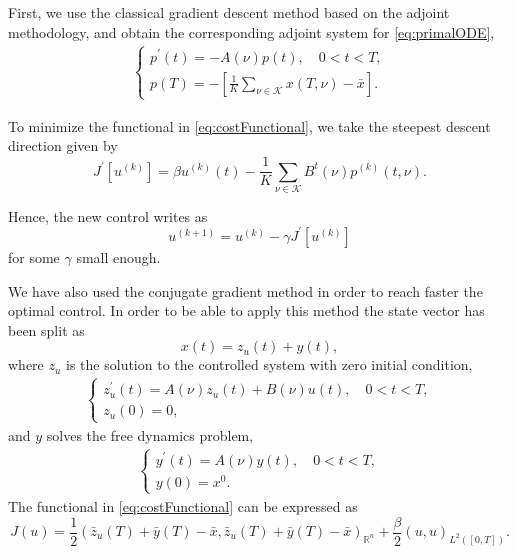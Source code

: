 \documentclass[10pt,a4paper]{article}
\begin{document}
First, we use the classical gradient descent method based on the adjoint methodology, and obtain the corresponding adjoint system for \eqref{eq:primalODE},
%
\begin{align}
\begin{cases}
p^\prime \left( t \right) = -A \left( \nu \right) p \left( t \right), \quad 0 < t <T, \\
p{\left( T \right)} = - \left[ \displaystyle \frac{1}{K} \sum_{\nu \in \mathcal{K}} x \left( T, \nu \right) - \bar{x} \right].
\end{cases}
\end{align}

To minimize the functional in \eqref{eq:costFunctional}, we take the steepest descent direction given by
%
\begin{equation}
J^\prime \left[ u^{\left( k \right)} \right] = \beta u^{\left( k \right)}\left( t \right) - \frac{1}{K} \sum_{\nu \in \mathcal{K}} B^t \left( \nu \right) p^{\left( k \right)} \left( t, \nu \right).
\end{equation}

Hence, the new control writes as
%
\begin{equation}
u^{\left( k+1 \right)} = u^{\left( k \right)} - \gamma J^\prime \left[ u^{\left( k \right)} \right]
\end{equation}
%
for some $\gamma$ small enough.

We have also used the conjugate gradient method in order to reach faster the optimal control. In order to be able to apply this method the state vector has been split as
%
\begin{equation}
x\left( t \right) = z_u \left( t \right) + y\left( t \right),
\end{equation}
%
where $z_u$ is the solution to the controlled system with zero initial condition,
%
\begin{align}
\begin{cases}
z^\prime_u \left( t \right) = A \left( \nu \right) z_u \left( t \right) + B \left( \nu \right) u \left( t \right), \quad 0 < t <T, \\
z_u{\left( 0 \right)} = 0,
\end{cases}
\end{align}
%
and $y$ solves the free dynamics problem,
%
\begin{align}
\begin{cases}
y^\prime \left( t \right) = A \left( \nu \right) y \left( t \right), \quad 0 < t <T, \\
y{\left( 0 \right)} = x^0.
\end{cases}
\end{align}
%
The functional in \eqref{eq:costFunctional} can be expressed as
%
\begin{equation}
J\left( u \right) = \frac{1}{2}\left( \bar{z}_u\left(T\right) + \bar{y} \left( T \right) - \bar{x}, \bar{z}_u\left(T\right) + \bar{y} \left( T \right) - \bar{x} \right)_{\displaystyle \mathbb{R}^n} + \frac{\beta}{2} \left(u, u\right)_{L^2\left(\left[0,T\right]\right)}.
\end{equation}
\end{document}
